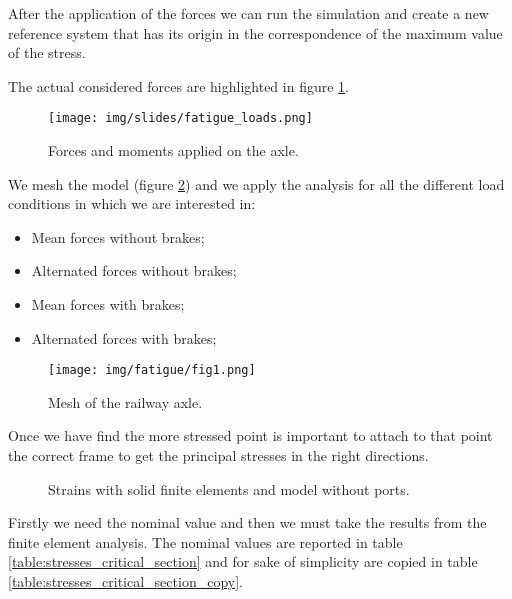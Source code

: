 \documentclass[a4paper,12pt]{article}
\begin{document}
After the application of the forces we can run the simulation and create a new reference system that has its origin in the correspondence of the maximum value of the stress.

The actual considered forces are highlighted in figure \ref{fig:fatigue_loads}.

\begin{figure}[H]
\centering
\caption{Forces and moments applied on the axle.}
\texttt{[image: img/slides/fatigue\_loads.png]}
\label{fig:fatigue_loads}
\end{figure}

We mesh the model (figure \ref{fig:fatigue_mesh}) and we apply the analysis for all the different load conditions in which we are interested in:
\begin{itemize}
\item Mean forces without brakes;
\item Alternated forces without brakes;
\item Mean forces with brakes;
\item Alternated forces with brakes;
\end{itemize}

\begin{figure}[H]
\centering
\caption{Mesh of the railway axle.}
\texttt{[image: img/fatigue/fig1.png]}
\label{fig:fatigue_mesh}
\end{figure}

Once we have find the more stressed point is important to attach to that point the correct frame to get the principal stresses in the right directions.


\begin{figure}[H]
\centering     %
\caption{Strains with solid finite elements and model without ports.}
\label{fig:solidmodel3_strain_bottom_ports}
\end{figure}

Firstly we need the nominal value and then we must take the results from the finite element analysis. The nominal values are reported in table \ref{table:stresses_critical_section} and for sake of simplicity are copied in table \ref{table:stresses_critical_section_copy}.
\end{document}
